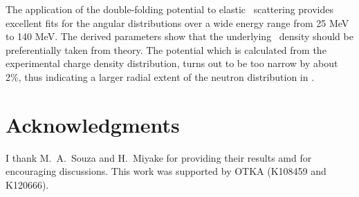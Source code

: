 The application of the double-folding potential to elastic \tinull \raa
\tinull\ scattering provides excellent fits for the angular distributions over
a wide energy range from 25 MeV to 140 MeV. The derived parameters show that
the underlying \tinull\ density should be preferentially taken from
theory. The potential which is calculated from the experimental charge density
distribution, turns out to be too narrow by about 2\%, thus indicating a
larger radial extent of the neutron distribution in \tinull .



\section*{Acknowledgments}
%
I thank M.\ A.\ Souza and H.\ Miyake for providing their results amd for
encouraging discussions. This work was supported by OTKA (K108459 and K120666).



